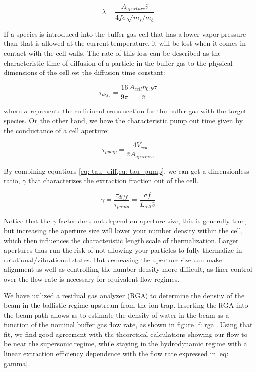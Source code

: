 \begin{equation*}
	\lambda = \frac{A_{aperture} \bar{v}}{4 f \sigma \sqrt{m_s/m_b}}
\end{equation*}

If a species is introduced into the buffer gas cell that has a lower vapor pressure than that is allowed at the current temperature, it will be lost when it comes in contact with the cell walls. The rate of this loss can be described as the  characteristic time of diffusion of a particle in the buffer gas to the physical dimensions of the cell set the diffusion time constant:

\begin{equation}
	\tau_{diff} = \frac{16}{9 \pi} \frac{A_{cell} n_{0,b} \sigma}{\bar{v}} \label{eq: tau_diff}
\end{equation}

where $\sigma$ represents the collisional cross section for the buffer gas with the target species. On the other hand, we have the characteristic pump out time given by the conductance of a cell aperture:

\begin{equation}
	\tau_{pump}=\frac{4V_{cell}}{\bar{v}A_{aperture}} \label{eq: tau_pump}
\end{equation}

By combining equations \cref{eq: tau_diff,eq: tau_pump}, we can get a dimensionless ratio, $\gamma$ that characterizes the extraction fraction out of the cell.

\begin{equation}
	\gamma = \frac{\tau_{diff}}{\tau_{pump}} = \frac{\sigma f}{L_{cell} \bar{v}} \label{eq: gamma}
\end{equation}

Notice that the $\gamma$ factor does not depend on aperture size, this is generally true, but increasing the aperture size will lower your number density within the cell, which then influences the characteristic length scale of thermalization. Larger apertures thus run the risk of not allowing your particles to fully thermalize in rotational/vibrational states. But decreasing the aperture size can make alignment as well as controlling the number density more difficult, as finer control over the flow rate is necessary for equivalent flow regimes.

We have utilized a residual gas analyzer (RGA) to determine the density of the beam in the ballistic regime upstream from the ion trap. Inserting the RGA into the beam path allows us to estimate the density of water in the beam as a function of the nominal buffer gas flow rate, as shown in figure \ref{f: rga}. Using that fit, we find good agreement with the theoretical calculations showing our flow to be near the supersonic regime, while staying in the hydrodynamic regime with a linear extraction efficiency dependence with the flow rate expressed in \ref{eq: gamma}.

